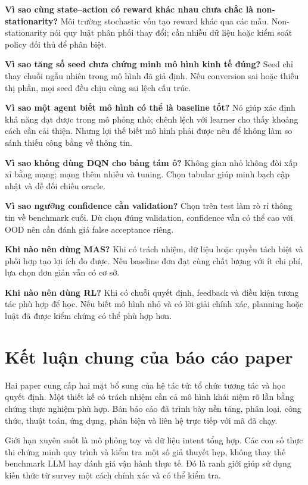 \textbf{Vì sao cùng state--action có reward khác nhau chưa chắc là
non-stationarity?} Môi trường stochastic vốn tạo reward khác qua các
mẫu. Non-stationarity nói quy luật phân phối thay đổi; cần nhiều dữ liệu
hoặc kiểm soát policy đối thủ để phân biệt.

\textbf{Vì sao tăng số seed chưa chứng minh mô hình kinh tế đúng?} Seed
chỉ thay chuỗi ngẫu nhiên trong mô hình đã giả định. Nếu conversion sai
hoặc thiếu thị phần, mọi seed đều chịu cùng sai lệch cấu trúc.

\textbf{Vì sao một agent biết mô hình có thể là baseline tốt?} Nó giúp
xác định khả năng đạt được trong mô phỏng nhỏ; chênh lệch với learner
cho thấy khoảng cách cần cải thiện. Nhưng lợi thế biết mô hình phải được
nêu để không làm so sánh thiếu công bằng về thông tin.

\textbf{Vì sao không dùng DQN cho bảng tám ô?} Không gian nhỏ không đòi
xấp xỉ bằng mạng; mạng thêm nhiễu và tuning. Chọn tabular giúp minh bạch
cập nhật và dễ đối chiếu oracle.

\textbf{Vì sao ngưỡng confidence cần validation?} Chọn trên test làm rò
rỉ thông tin về benchmark cuối. Dù chọn đúng validation, confidence vẫn
có thể cao với OOD nên cần đánh giá false acceptance riêng.

\textbf{Khi nào nên dùng MAS?} Khi có trách nhiệm, dữ liệu hoặc quyền
tách biệt và phối hợp tạo lợi ích đo được. Nếu baseline đơn đạt cùng
chất lượng với ít chi phí, lựa chọn đơn giản vẫn có cơ sở.

\textbf{Khi nào nên dùng RL?} Khi có chuỗi quyết định, feedback và điều
kiện tương tác phù hợp để học. Nếu biết mô hình nhỏ và có lời giải chính
xác, planning hoặc luật đã được kiểm chứng có thể phù hợp hơn.

\section{Kết luận chung của báo cáo
paper}\label{kux1ebft-luux1eadn-chung-cux1ee7a-buxe1o-cuxe1o-paper}

Hai paper cung cấp hai mặt bổ sung của hệ tác tử: tổ chức tương tác và
học quyết định. Một thiết kế có trách nhiệm cần cả mô hình khái niệm rõ
lẫn bằng chứng thực nghiệm phù hợp. Bản báo cáo đã trình bày nền tảng,
phân loại, công thức, thuật toán, ứng dụng, phản biện và liên hệ trực
tiếp với mã đã chạy.

Giới hạn xuyên suốt là mô phỏng toy và dữ liệu intent tổng hợp. Các con
số thực thi chứng minh quy trình và kiểm tra một số giả thuyết hẹp,
không thay thế benchmark LLM hay đánh giá vận hành thực tế. Đó là ranh
giới giúp sử dụng kiến thức từ survey một cách chính xác và có thể kiểm
tra.
